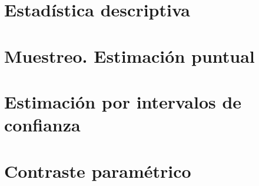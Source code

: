 \documentclass[a4paper]{book}
\begin{document}
\section{Estadística descriptiva}

\section{Muestreo. Estimación puntual}

\section{Estimación por intervalos de confianza}

\section{Contraste paramétrico}



% 
\end{document}
